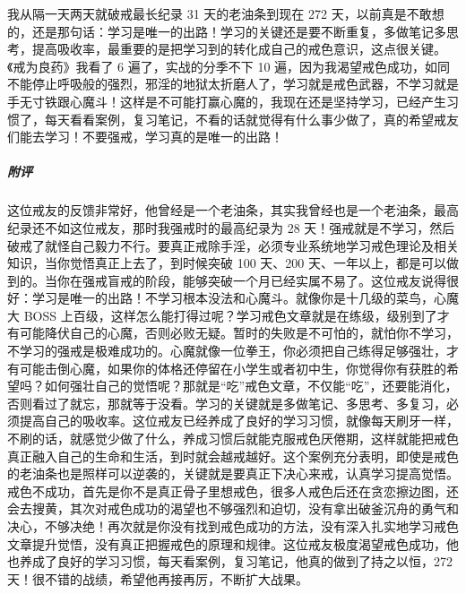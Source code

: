 \begin{case}
    我从隔一天两天就破戒最长纪录 31 天的老油条到现在 272 天，以前真是不敢想的，还是那句话：学习是唯一的出路！学习的关键还是要不断重复，多做笔记多思考，提高吸收率，最重要的是把学习到的转化成自己的戒色意识，这点很关键。《戒为良药》我看了 6 遍了，实战的分季不下 10 遍，因为我渴望戒色成功，如同不能停止呼吸般的强烈，邪淫的地狱太折磨人了，学习就是戒色武器，不学习就是手无寸铁跟心魔斗！这样是不可能打赢心魔的，我现在还是坚持学习，已经产生习惯了，每天看看案例，复习笔记，不看的话就觉得有什么事少做了，真的希望戒友们能去学习！不要强戒，学习真的是唯一的出路！
    \subparagraph{附评} 这位戒友的反馈非常好，他曾经是一个老油条，其实我曾经也是一个老油条，最高纪录还不如这位戒友，那时我强戒时的最高纪录为 28 天！强戒就是不学习，然后破戒了就怪自己毅力不行。要真正戒除手淫，必须专业系统地学习戒色理论及相关知识，当你觉悟真正上去了，到时候突破 100 天、200 天、一年以上，都是可以做到的。当你在强戒盲戒的阶段，能够突破一个月已经实属不易了。这位戒友说得很好：学习是唯一的出路！不学习根本没法和心魔斗。就像你是十几级的菜鸟，心魔大 BOSS 上百级，这样怎么能打得过呢？学习戒色文章就是在练级，级别到了才有可能降伏自己的心魔，否则必败无疑。暂时的失败是不可怕的，就怕你不学习，不学习的强戒是极难成功的。心魔就像一位拳王，你必须把自己练得足够强壮，才有可能击倒心魔，如果你的体格还停留在小学生或者初中生，你觉得你有获胜的希望吗？如何强壮自己的觉悟呢？那就是“吃”戒色文章，不仅能“吃”，还要能消化，否则看过了就忘，那就等于没看。学习的关键就是多做笔记、多思考、多复习，必须提高自己的吸收率。这位戒友已经养成了良好的学习习惯，就像每天刷牙一样，不刷的话，就感觉少做了什么，养成习惯后就能克服戒色厌倦期，这样就能把戒色真正融入自己的生命和生活，到时就会越戒越好。这个案例充分表明，即使是戒色的老油条也是照样可以逆袭的，关键就是要真正下决心来戒，认真学习提高觉悟。戒色不成功，首先是你不是真正骨子里想戒色，很多人戒色后还在贪恋擦边图，还会去搜黄，其次对戒色成功的渴望也不够强烈和迫切，没有拿出破釜沉舟的勇气和决心，不够决绝！再次就是你没有找到戒色成功的方法，没有深入扎实地学习戒色文章提升觉悟，没有真正把握戒色的原理和规律。这位戒友极度渴望戒色成功，他也养成了良好的学习习惯，每天看案例，复习笔记，他真的做到了持之以恒，272 天！很不错的战绩，希望他再接再厉，不断扩大战果。
\end{case}

